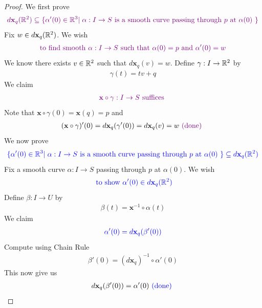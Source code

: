 \documentclass{report}
\begin{document}
\begin{proof}
We first prove 
\begin{align*}
 \textcolor{violet}{d\textbf{x}_q(\mathbb{R}^2)\subseteq\{ \alpha '(0)\in\mathbb{R}^3|\hspace{0.1cm}\alpha:I\rightarrow S \text{ is a smooth curve  passing through $p$ at $\alpha (0)$ } \}}
\end{align*}
Fix $w\in d\textbf{x}_q(\mathbb{R}^2)$. We wish
\begin{align*}
\textcolor{violet}{\text{ to find smooth $\alpha :I\rightarrow S$ such that $\alpha (0)=p$ and $\alpha '(0)=w$ }}
\end{align*}
We know there exists $v \in\mathbb{R}^2$ such that $d\textbf{x}_q(v)=w$. Define $\gamma :I\rightarrow \mathbb{R}^2$ by 
\begin{align*}
\gamma (t)= tv+q
\end{align*}
We claim 
\begin{align*}
  \textcolor{violet}{\textbf{x}\circ \gamma :I\rightarrow S\text{ suffices }}
\end{align*}
Note that $\textbf{x}\circ \gamma (0)=\textbf{x}(q)=p$ and
\begin{align*}
(\textbf{x}\circ \gamma )'(0)=d\textbf{x}_q(\gamma '(0))=d\textbf{x}_q(v)=w \textcolor{violet}{\text{ (done) }} 
\end{align*}
We now prove 
\begin{align*}
\textcolor{blue}{\{ \alpha '(0)\in\mathbb{R}^3|\hspace{0.1cm}\alpha:I\rightarrow S \text{ is a smooth curve  passing through $p$ at $\alpha (0)$ } \}\subseteq d\textbf{x}_q(\mathbb{R}^2)}
\end{align*}
Fix a smooth curve $\alpha :I \rightarrow S$ passing through $p$ at $\alpha (0)$. We wish 
\begin{align*}
\textcolor{blue}{\text{ to show }\alpha '(0)\in d\textbf{x}_q(\mathbb{R}^2)}
\end{align*}
Define $\beta :I\rightarrow U$ by 
\begin{align*}
\beta (t)=\textbf{x}^{-1}\circ \alpha (t)
\end{align*}
We claim 
\begin{align*}
\textcolor{blue}{\alpha '(0)=d\textbf{x}_q(\beta '(0))}
\end{align*}
Compute using Chain Rule 
\begin{align*}
\beta '(0)=(d\textbf{x}_q)^{-1}\circ \alpha '(0)
\end{align*}
This now give us 
\begin{align*}
d\textbf{x}_q(\beta '(0))=\alpha '(0)\textcolor{blue}{\text{ (done) }}
\end{align*}
\end{proof}
\end{document}
